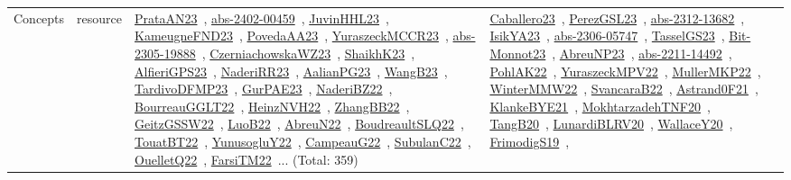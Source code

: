 {\begin{longtable}{lp{3cm}>{\raggedright\arraybackslash}p{6cm}>{\raggedright\arraybackslash}p{6cm}>{\raggedright\arraybackslash}p{8cm}}
Concepts & resource & \href{works/PrataAN23.pdf}{PrataAN23}~\cite{PrataAN23}, \href{works/abs-2402-00459.pdf}{abs-2402-00459}~\cite{abs-2402-00459}, \href{works/JuvinHHL23.pdf}{JuvinHHL23}~\cite{JuvinHHL23}, \href{works/KameugneFND23.pdf}{KameugneFND23}~\cite{KameugneFND23}, \href{works/PovedaAA23.pdf}{PovedaAA23}~\cite{PovedaAA23}, \href{works/YuraszeckMCCR23.pdf}{YuraszeckMCCR23}~\cite{YuraszeckMCCR23}, \href{works/abs-2305-19888.pdf}{abs-2305-19888}~\cite{abs-2305-19888}, \href{works/CzerniachowskaWZ23.pdf}{CzerniachowskaWZ23}~\cite{CzerniachowskaWZ23}, \href{works/ShaikhK23.pdf}{ShaikhK23}~\cite{ShaikhK23}, \href{works/AlfieriGPS23.pdf}{AlfieriGPS23}~\cite{AlfieriGPS23}, \href{works/NaderiRR23.pdf}{NaderiRR23}~\cite{NaderiRR23}, \href{works/AalianPG23.pdf}{AalianPG23}~\cite{AalianPG23}, \href{works/WangB23.pdf}{WangB23}~\cite{WangB23}, \href{works/TardivoDFMP23.pdf}{TardivoDFMP23}~\cite{TardivoDFMP23}, \href{works/GurPAE23.pdf}{GurPAE23}~\cite{GurPAE23}, \href{works/NaderiBZ22.pdf}{NaderiBZ22}~\cite{NaderiBZ22}, \href{works/BourreauGGLT22.pdf}{BourreauGGLT22}~\cite{BourreauGGLT22}, \href{works/HeinzNVH22.pdf}{HeinzNVH22}~\cite{HeinzNVH22}, \href{works/ZhangBB22.pdf}{ZhangBB22}~\cite{ZhangBB22}, \href{works/GeitzGSSW22.pdf}{GeitzGSSW22}~\cite{GeitzGSSW22}, \href{works/LuoB22.pdf}{LuoB22}~\cite{LuoB22}, \href{works/AbreuN22.pdf}{AbreuN22}~\cite{AbreuN22}, \href{works/BoudreaultSLQ22.pdf}{BoudreaultSLQ22}~\cite{BoudreaultSLQ22}, \href{works/TouatBT22.pdf}{TouatBT22}~\cite{TouatBT22}, \href{works/YunusogluY22.pdf}{YunusogluY22}~\cite{YunusogluY22}, \href{works/CampeauG22.pdf}{CampeauG22}~\cite{CampeauG22}, \href{works/SubulanC22.pdf}{SubulanC22}~\cite{SubulanC22}, \href{works/OuelletQ22.pdf}{OuelletQ22}~\cite{OuelletQ22}, \href{works/FarsiTM22.pdf}{FarsiTM22}~\cite{FarsiTM22}... (Total: 359) & \href{works/Caballero23.pdf}{Caballero23}~\cite{Caballero23}, \href{works/PerezGSL23.pdf}{PerezGSL23}~\cite{PerezGSL23}, \href{works/abs-2312-13682.pdf}{abs-2312-13682}~\cite{abs-2312-13682}, \href{works/IsikYA23.pdf}{IsikYA23}~\cite{IsikYA23}, \href{works/abs-2306-05747.pdf}{abs-2306-05747}~\cite{abs-2306-05747}, \href{works/TasselGS23.pdf}{TasselGS23}~\cite{TasselGS23}, \href{works/Bit-Monnot23.pdf}{Bit-Monnot23}~\cite{Bit-Monnot23}, \href{works/AbreuNP23.pdf}{AbreuNP23}~\cite{AbreuNP23}, \href{works/abs-2211-14492.pdf}{abs-2211-14492}~\cite{abs-2211-14492}, \href{works/PohlAK22.pdf}{PohlAK22}~\cite{PohlAK22}, \href{works/YuraszeckMPV22.pdf}{YuraszeckMPV22}~\cite{YuraszeckMPV22}, \href{works/MullerMKP22.pdf}{MullerMKP22}~\cite{MullerMKP22}, \href{works/WinterMMW22.pdf}{WinterMMW22}~\cite{WinterMMW22}, \href{works/SvancaraB22.pdf}{SvancaraB22}~\cite{SvancaraB22}, \href{works/Astrand0F21.pdf}{Astrand0F21}~\cite{Astrand0F21}, \href{works/KlankeBYE21.pdf}{KlankeBYE21}~\cite{KlankeBYE21}, \href{works/MokhtarzadehTNF20.pdf}{MokhtarzadehTNF20}~\cite{MokhtarzadehTNF20}, \href{works/TangB20.pdf}{TangB20}~\cite{TangB20}, \href{works/LunardiBLRV20.pdf}{LunardiBLRV20}~\cite{LunardiBLRV20}, \href{works/WallaceY20.pdf}{WallaceY20}~\cite{WallaceY20}, \href{works/FrimodigS19.pdf}{FrimodigS19}~\cite{FrimodigS19}, 
\end{longtable}}
